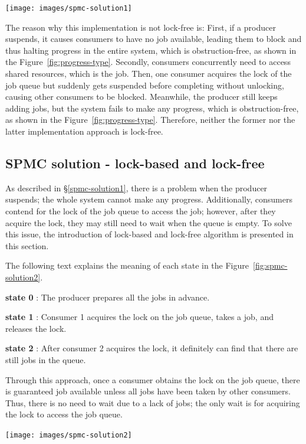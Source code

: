 \documentclass[fontsize=10pt, oneside]{scrartcl}
\newcommand{\fig}[1]{Figure~\ref{#1}}
\newcommand{\secref}[1]{\hyperref[#1]{\textsc{\S}\ref*{#1}}}
\begin{document}
\texttt{[image: images/spmc-solution1]}
\label{fig:spmc-solution1}

The reason why this implementation is not lock-free is: 
First, if a producer suspends, 
it causes consumers to have no job available, 
leading them to block and thus halting progress in the entire system, 
which is obstruction-free, as shown in the \fig{fig:progress-type}.
Secondly, consumers concurrently need to access shared resources, which is the job.
Then, one consumer acquires the lock of the job queue but suddenly gets suspended before completing without unlocking, 
causing other consumers to be blocked.
Meanwhile, the producer still keeps adding jobs, but the system fails to make any progress,
which is obstruction-free, as shown in the \fig{fig:progress-type}.
Therefore, neither the former nor the latter implementation approach is lock-free.

\subsection{SPMC solution - lock-based and lock-free}
\label{spmc-solution2}
As described in \secref{spmc-solution1}, there is a problem when the producer suspends; 
the whole system cannot make any progress.
Additionally, consumers contend for the lock of the job queue to access the job; 
however, after they acquire the lock, they may still need to wait when the queue is empty. 
To solve this issue, the introduction of lock-based and lock-free algorithm is presented in this section.

The following text explains the meaning of each state in the \fig{fig:spmc-solution2}.

\textbf{state 0} : The producer prepares all the jobs in advance.

\textbf{state 1} : Consumer 1 acquires the lock on the job queue, takes a job, and releases the lock.

\textbf{state 2} : After consumer 2 acquires the lock, it definitely can find that there are still jobs in the queue.

Through this approach, once a consumer obtains the lock on the job queue, 
there is guaranteed job available unless all jobs have been taken by other consumers.
Thus, there is no need to wait due to a lack of jobs; 
the only wait is for acquiring the lock to access the job queue.

\texttt{[image: images/spmc-solution2]}
\label{fig:spmc-solution2}
\end{document}
